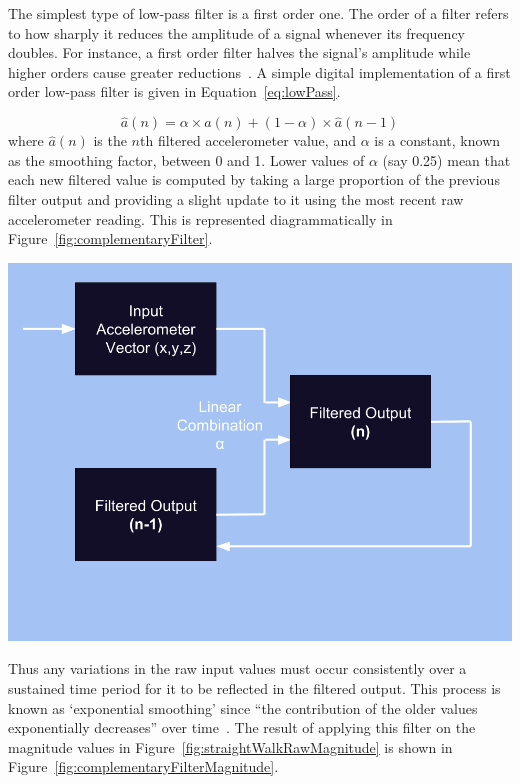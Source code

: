 \documentclass[12pt,a4paper,notitlepage]{report}
\begin{document}
The simplest type of low-pass filter is a first order one. The order of a filter refers to how sharply it reduces the amplitude of a signal whenever its frequency doubles. For instance, a first order filter halves the signal's amplitude while higher orders cause greater reductions~\cite[p.2528]{casiez20121}. A simple digital implementation of a first order low-pass filter is given in Equation~\ref{eq:lowPass}.   

\begin{equation}\label{eq:lowPass}
\hat{a}(n) = \alpha \times a(n) + (1 - \alpha) \times \hat{a}(n-1)
\end{equation}
where $\hat{a}(n)$ is the $n$th filtered accelerometer value, and $\alpha$ is a constant, known as the smoothing factor, between 0 and 1. Lower values of $\alpha$ (say 0.25) mean that each new filtered value is computed by taking a large proportion of the previous filter output and providing a slight update to it using the most recent raw accelerometer reading. This is represented diagrammatically in Figure~\ref{fig:complementaryFilter}.  

\begin{center}
\includegraphics[scale=0.3]{images/complementaryFilter.png}
\label{fig:complementaryFilter}
\end{center}
Thus any variations in the raw input values must occur consistently over a sustained time period for it to be reflected in the filtered output. This process is known as `exponential smoothing' since ``the contribution of the older values exponentially decreases'' over time~\cite[p.2528]{casiez20121}. The result of applying this filter on the magnitude values in Figure~\ref{fig:straightWalkRawMagnitude} is shown in Figure~\ref{fig:complementaryFilterMagnitude}. 
\end{document}
